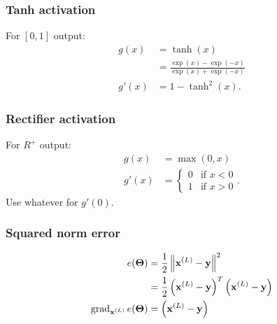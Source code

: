 \subsubsection{Tanh activation}
For $[0, 1]$ output:
\begin{align}
    g(x)    &= \tanh(x) \\
            &= \frac{\exp(x) - \exp(-x)}{\exp(x) + \exp(-x)} \\
    g'(x)   &= 1 - \tanh^2(x).
\end{align}

\subsubsection{Rectifier activation}
For $R^+$ output:
\begin{align}
    g(x)    &= \max(0, x) \\
    g'(x)   &=
        \begin{cases}
            0 & \text{if } x < 0 \\
            1 & \text{if } x > 0
        \end{cases}.
\end{align}
Use whatever for $g'(0)$.

\subsubsection{Squared norm error}
\begin{align}
    e(\boldsymbol{\mathbf{\Theta}})  &= \frac{1}{2}\left\|\boldsymbol{\mathbf{x}}^{(L)} - \boldsymbol{\mathbf{y}} \right\|^2 \\
                    &= \frac{1}{2}\left(\boldsymbol{\mathbf{x}}^{(L)} - \boldsymbol{\mathbf{y}}\right)^T \left(\boldsymbol{\mathbf{x}}^{(L)} - \boldsymbol{\mathbf{y}}\right) \\
    \operatorname{\mathrm{grad}}_{\boldsymbol{\mathbf{x}}^{(L)}} e(\boldsymbol{\mathbf{\Theta}}) &= \left(\boldsymbol{\mathbf{x}}^{(L)} - \boldsymbol{\mathbf{y}}\right)
\end{align}


